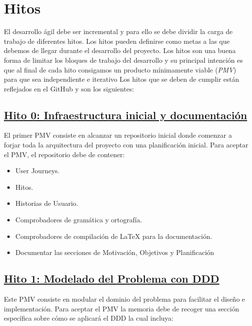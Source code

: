 \section{Hitos}
\label{sec:hitos}
El desarrollo ágil debe ser incremental y para ello se debe dividir la carga de trabajo de diferentes hitos.
Los hitos pueden definirse como metas a las que debemos de llegar durante el desarrollo del proyecto.
Los hitos son una buena forma de limitar los bloques de trabajo del desarrollo y su principal intención es que
al final de cada hito consigamos un producto mínimamente viable (\textit{PMV}) para que sea independiente e iterativo
Los hitos que se deben de cumplir están reflejados en el GitHub y son los siguientes:

\subsection*{\href{https://github.com/RubenDelgadoPareja/TFG-Triage-Inteligente-Consulta-Medica/milestone/1}{Hito 0: Infraestructura inicial y documentación}}
\label{sb:hito0}

El primer PMV consiste en alcanzar un repositorio inicial donde comenzar a forjar toda la arquitectura del proyecto con una planificación inicial.
Para aceptar el PMV, el repositorio debe de contener:

\begin{itemize}
    \item{User Journeys.}
    \item{Hitos.}
    \item{Historias de Usuario.}
    \item{Comprobadores de gramática y ortografía.}
    \item{Comprobadores de compilación de LaTeX para la documentación.}
    \item{Documentar las secciones de Motivación, Objetivos y Planificación}
\end{itemize}

\subsection*{\href{https://github.com/RubenDelgadoPareja/TFG-Triage-Inteligente-Consulta-Medica/milestone/7}{Hito 1: Modelado del Problema con DDD}}
\label{sb:hito1}

Este PMV consiste en modular el dominio del problema para facilitar el diseño e implementación.
Para aceptar el PMV la memoria debe de recoger una sección específica sobre cómo se aplicará el DDD la cual incluya:

